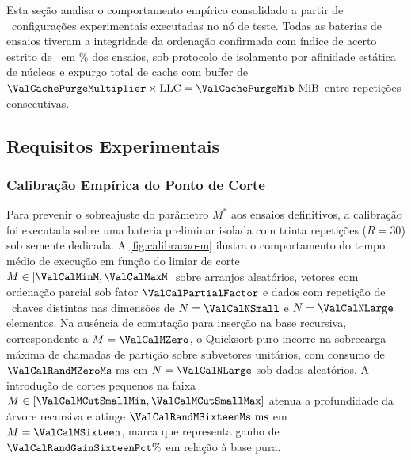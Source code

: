 \documentclass[12pt]{article}
\begin{document}
Esta seção analisa o comportamento empírico consolidado a partir de \ValTotalConfigs\ configurações experimentais executadas no nó de teste. Todas as baterias de ensaios tiveram a integridade da ordenação confirmada com índice de acerto estrito de \ValSortedOkVal\ em \ValSortedOkPct\% dos ensaios, sob protocolo de isolamento por afinidade estática de núcleos e expurgo total de cache com buffer de $\ValCachePurgeMultiplier\times\text{LLC} = \ValCachePurgeMib\text{ MiB}$ entre repetições consecutivas.

\subsection{Requisitos Experimentais}\label{sec:res-requisitos}

\subsubsection{Calibração Empírica do Ponto de Corte}\label{sec:res-calibracao-m}

Para prevenir o sobreajuste do parâmetro $M^*$ aos ensaios definitivos, a calibração foi executada sobre uma bateria preliminar isolada com trinta repetições ($R = 30$) sob semente dedicada. A \cref{fig:calibracao-m} ilustra o comportamento do tempo médio de execução em função do limiar de corte $M \in [\ValCalMinM, \ValCalMaxM]$ sobre arranjos aleatórios, vetores com ordenação parcial sob fator $\ValCalPartialFactor$ e dados com repetição de \ValCalRepeatedKeys\ chaves distintas nas dimensões de $N = \ValCalNSmall$ e $N = \ValCalNLarge$ elementos. Na ausência de comutação para inserção na base recursiva, correspondente a $M = \ValCalMZero$, o Quicksort puro incorre na sobrecarga máxima de chamadas de partição sobre subvetores unitários, com consumo de $\ValCalRandMZeroMs\text{ ms}$ em $N = \ValCalNLarge$ sob dados aleatórios. A introdução de cortes pequenos na faixa $M \in [\ValCalMCutSmallMin, \ValCalMCutSmallMax]$ atenua a profundidade da árvore recursiva e atinge $\ValCalRandMSixteenMs\text{ ms}$ em $M = \ValCalMSixteen$, marca que representa ganho de $\ValCalRandGainSixteenPct\%$ em relação à base pura.


\end{document}
